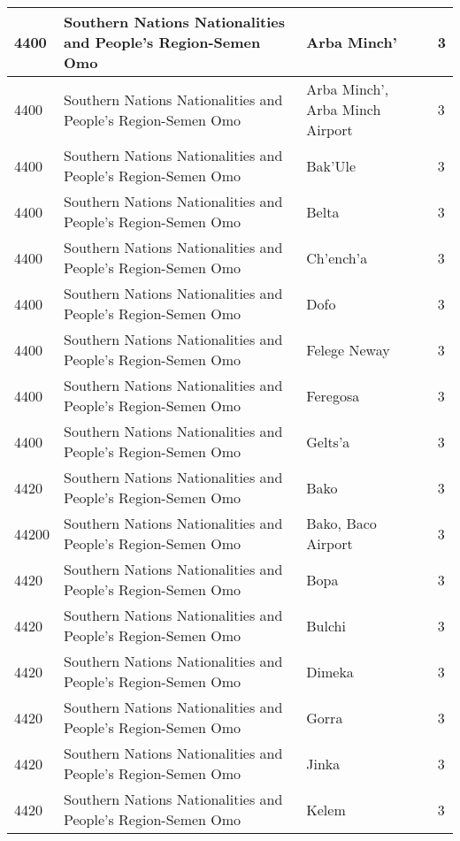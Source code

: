 \documentclass[12pt,a4paper,openbib,titlepage]{report}
\begin{document}
\begin{longtable}{|p{2cm}|p{6.5cm}|p{8cm}|p{1.5cm}|}
\hline 
\rule[-1ex]{0pt}{2.5ex} 4400 & Southern Nations Nationalities and People's Region-Semen Omo & Arba Minch' & 3 \\ 
\hline 
\rule[-1ex]{0pt}{2.5ex} 4400 & Southern Nations Nationalities and People's Region-Semen Omo & Arba Minch', Arba Minch Airport & 3 \\ 
\hline 
\rule[-1ex]{0pt}{2.5ex} 4400 & Southern Nations Nationalities and People's Region-Semen Omo & Bak'Ule & 3 \\ 
\hline 
\rule[-1ex]{0pt}{2.5ex} 4400 & Southern Nations Nationalities and People's Region-Semen Omo & Belta & 3 \\ 
\hline 
\rule[-1ex]{0pt}{2.5ex} 4400 & Southern Nations Nationalities and People's Region-Semen Omo & Ch'ench'a & 3 \\  
\hline 
\rule[-1ex]{0pt}{2.5ex} 4400 & Southern Nations Nationalities and People's Region-Semen Omo & Dofo & 3 \\ 
\hline 
\rule[-1ex]{0pt}{2.5ex} 4400 & Southern Nations Nationalities and People's Region-Semen Omo & Felege Neway & 3 \\ 
\hline 
\rule[-1ex]{0pt}{2.5ex} 4400 & Southern Nations Nationalities and People's Region-Semen Omo & Feregosa & 3 \\  
\hline 
\rule[-1ex]{0pt}{2.5ex} 4400 & Southern Nations Nationalities and People's Region-Semen Omo & Gelts'a & 3 \\  
\hline 
\rule[-1ex]{0pt}{2.5ex} 4420 & Southern Nations Nationalities and People's Region-Semen Omo & Bako & 3 \\ 
\hline 
\rule[-1ex]{0pt}{2.5ex} 44200 & Southern Nations Nationalities and People's Region-Semen Omo & Bako, Baco Airport & 3 \\ 
\hline 
\rule[-1ex]{0pt}{2.5ex} 4420 & Southern Nations Nationalities and People's Region-Semen Omo & Bopa & 3 \\
\hline 
\rule[-1ex]{0pt}{2.5ex} 4420 & Southern Nations Nationalities and People's Region-Semen Omo & Bulchi & 3 \\
\hline 
\rule[-1ex]{0pt}{2.5ex} 4420 & Southern Nations Nationalities and People's Region-Semen Omo & Dimeka & 3 \\
\hline 
\rule[-1ex]{0pt}{2.5ex} 4420 & Southern Nations Nationalities and People's Region-Semen Omo & Gorra & 3 \\
\hline 
\rule[-1ex]{0pt}{2.5ex} 4420 & Southern Nations Nationalities and People's Region-Semen Omo & Jinka & 3 \\
\hline 
\rule[-1ex]{0pt}{2.5ex} 4420 & Southern Nations Nationalities and People's Region-Semen Omo & Kelem & 3 \\

\end{longtable}
\end{document}
